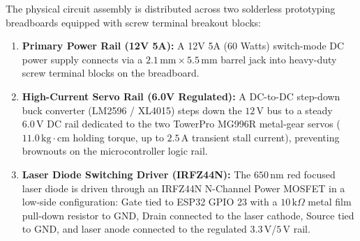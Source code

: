 The physical circuit assembly is distributed across two solderless prototyping breadboards equipped with screw terminal breakout blocks:
\begin{enumerate}
    \item \textbf{Primary Power Rail (12V 5A):} A 12V 5A (60 Watts) switch-mode DC power supply connects via a $2.1\,\text{mm} \times 5.5\,\text{mm}$ barrel jack into heavy-duty screw terminal blocks on the breadboard.
    \item \textbf{High-Current Servo Rail (6.0V Regulated):} A DC-to-DC step-down buck converter (LM2596 / XL4015) steps down the $12\,\text{V}$ bus to a steady $6.0\,\text{V}$ DC rail dedicated to the two TowerPro MG996R metal-gear servos ($11.0\,\text{kg}\cdot\text{cm}$ holding torque, up to $2.5\,\text{A}$ transient stall current), preventing brownouts on the microcontroller logic rail.
    \item \textbf{Laser Diode Switching Driver (IRFZ44N):} The $650\,\text{nm}$ red focused laser diode is driven through an IRFZ44N N-Channel Power MOSFET in a low-side configuration: Gate tied to ESP32 GPIO 23 with a $10\,\text{k}\Omega$ metal film pull-down resistor to GND, Drain connected to the laser cathode, Source tied to GND, and laser anode connected to the regulated $3.3\,\text{V}$/$5\,\text{V}$ rail.
\end{enumerate}

